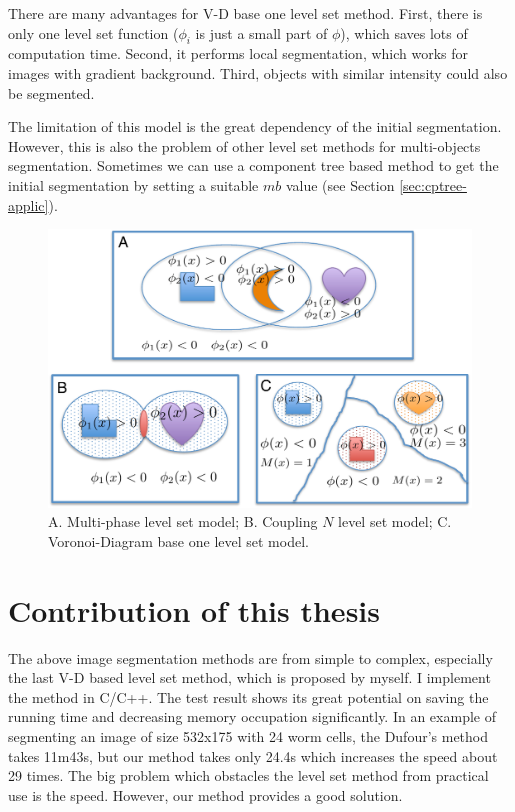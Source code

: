 There are many advantages for V-D base one level set method. First, there is only one level set function ($\phi_i$ is just a small part of $\phi$), which saves lots of computation time. Second, it performs local segmentation, which works for images with gradient background. Third, objects with similar intensity could also be segmented.

The limitation of this model is the great dependency of the initial segmentation. However, this is also the problem of other level set methods for multi-objects segmentation. Sometimes we can use a component tree based method to get the initial segmentation by setting a suitable $mb$ value (see Section \ref{sec:cptree-applic}).

\begin{figure}[htbp]
\centering
\includegraphics[width=1.0\textwidth]{images/imgseg_multiobjs}
\caption[The level set model of multi-objects segmentation]{A. Multi-phase level set model; B. Coupling $N$ level set model; C. Voronoi-Diagram base one level set model.}
\label{fig:imgseg-multiobjs}
\end{figure}
\section{Contribution of this thesis} \label{seg:imgseg-mywork}
The above image segmentation methods are from simple to complex, especially the last V-D based level set method, which is proposed by myself. I implement the method in C/C++. The test result shows its great potential on saving the running time and decreasing memory occupation significantly. In an example of segmenting an image of size 532x175 with 24 worm cells, the Dufour's method takes 11m43s, but our method takes only 24.4s which increases the speed about 29 times. The big problem which obstacles the level set method from practical use is the speed. However, our method provides a good solution.
